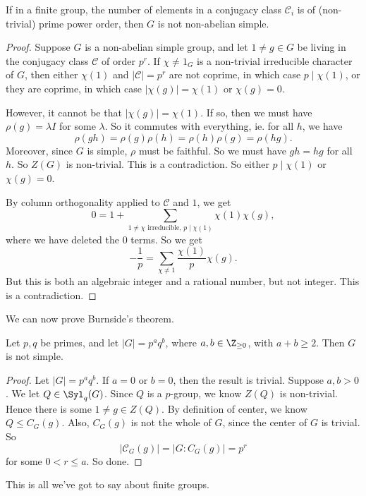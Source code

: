 \documentclass[a4paper]{article}
\begin{document}
\begin{prop}
  If in a finite group, the number of elements in a conjugacy class $\mathcal{C}_i$ is of (non-trivial) prime power order, then $G$ is not non-abelian simple.
\end{prop}

\begin{proof}
  Suppose $G$ is a non-abelian simple group, and let $1 \not= g \in G$ be living in the conjugacy class $\mathcal{C}$ of order $p^r$. If $\chi \not= 1_G$ is a non-trivial irreducible character of $G$, then either $\chi(1)$ and $|\mathcal{C}| = p^r$ are not coprime, in which case $p \mid \chi(1)$, or they are coprime, in which case $|\chi(g)| = \chi(1)$ or $\chi(g) = 0$.

  However, it cannot be that $|\chi(g)| = \chi(1)$. If so, then we must have $\rho(g) = \lambda I$ for some $\lambda$. So it commutes with everything, ie. for all $h$, we have
  \[
    \rho(gh) = \rho(g)\rho(h) = \rho(h)\rho(g) = \rho(hg).
  \]
  Moreover, since $G$ is simple, $\rho$ must be faithful. So we must have $gh = hg$ for all $h$. So $Z(G)$ is non-trivial. This is a contradiction. So either $p \mid \chi(1)$ or $\chi(g) = 0$.

  By column orthogonality applied to $\mathcal{C}$ and $1$, we get
  \[
    0 = 1 + \sum_{1 \not= \chi\text{ irreducible, } p \mid \chi(1)} \chi(1) \chi(g),
  \]
  where we have deleted the $0$ terms. So we get
  \[
    -\frac{1}{p} = \sum_{\chi \not= 1} \frac{\chi(1)}{p} \chi(g).
  \]
  But this is both an algebraic integer and a rational number, but not integer. This is a contradiction.
\end{proof}

We can now prove Burnside's theorem.
\begin{thm}
  Let $p, q$ be primes, and let $|G| = p^a q^b$, where $a, b \in \Z_{\geq 0}$, with $a + b \geq 2$. Then $G$ is not simple.
\end{thm}

\begin{proof}
  Let $|G| = p^a q^b$. If $a = 0$ or $b = 0$, then the result is trivial. Suppose $a, b > 0$. We let $Q \in \Syl_q(G)$. Since $Q$ is a $p$-group, we know $Z(Q)$ is non-trivial. Hence there is some $1 \not= g \in Z(Q)$. By definition of center, we know $Q \leq C_G(g)$. Also, $C_G(g)$ is not the whole of $G$, since the center of $G$ is trivial. So
  \[
    |\mathcal{C}_G(g)| = |G: C_G(g)| = p^r
  \]
  for some $0 < r \leq a$. So done.
\end{proof}
This is all we've got to say about finite groups.
\end{document}
